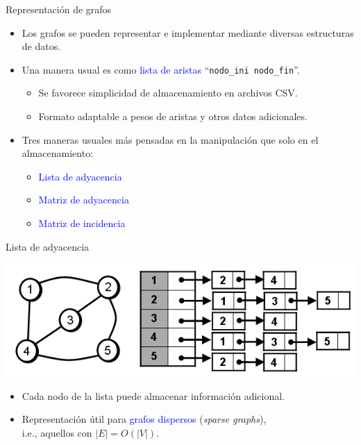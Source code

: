 \documentclass{beamer} %
\newcommand{\blue}[1]{\textcolor{blue}{#1}}
\begin{document}
\begin{frame}{Representación de grafos}
    \begin{itemize}
        \item<1-> Los grafos se pueden representar e implementar mediante diversas estructuras de datos.
        \item<1-> Una manera usual es como \blue{lista de aristas} ``{\scriptsize\texttt{nodo\_ini nodo\_fin}}''.
        \begin{itemize}
            \item Se favorece simplicidad de almacenamiento en archivos CSV.
            \item Formato adaptable a pesos de aristas y otros datos adicionales.
        \end{itemize}
        \item<2-> Tres maneras usuales más pensadas en la manipulación que solo en el almacenamiento:
        \begin{itemize}
            \item \blue{Lista de adyacencia}
            \item \blue{Matriz de adyacencia}
            \item \blue{Matriz de incidencia}
        \end{itemize}
    \end{itemize}
\end{frame}

\begin{frame}{Lista de adyacencia}
    \begin{center}
      \includegraphics[width=\textwidth]{./image/cap6/lista-adyacencia.jpg}
    \end{center}
    \begin{itemize}
        \item Cada nodo de la lista puede almacenar información adicional.
        \item Representación útil para \blue{grafos dispersos} ({\em sparse graphs}),\\
        i.e., aquellos con $|E|=O(|V|)$.
    \end{itemize}
\end{frame}
\end{document}
